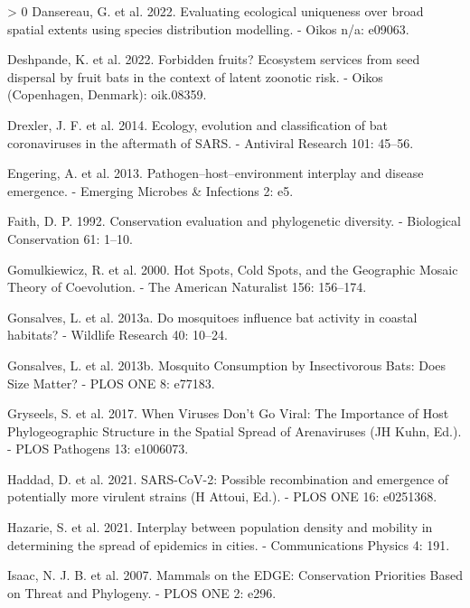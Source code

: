 \documentclass[11pt]{article}
\newlength{\cslhangindent}
\newenvironment{CSLReferences}[3] %
 {%
  \setlength{\parindent}{0pt}
  \ifodd #1 \everypar{\setlength{\hangindent}{\cslhangindent}}\ignorespaces\fi
  \ifnum #2 > 0
  \setlength{\parskip}{#2\baselineskip}
  \fi
 }%
 {}
\begin{document}
\begin{CSLReferences}{1}{0}
\leavevmode\hypertarget{ref-Dansereau2022EvaEco}{}%
Dansereau, G. et al. 2022. Evaluating ecological uniqueness over broad
spatial extents using species distribution modelling. - Oikos n/a:
e09063.

\leavevmode\hypertarget{ref-Deshpande2022ForFru}{}%
Deshpande, K. et al. 2022. Forbidden fruits? Ecosystem services from
seed dispersal by fruit bats in the context of latent zoonotic risk. -
Oikos (Copenhagen, Denmark): oik.08359.

\leavevmode\hypertarget{ref-Drexler2014EcoEvo}{}%
Drexler, J. F. et al. 2014. Ecology, evolution and classification of bat
coronaviruses in the aftermath of SARS. - Antiviral Research 101:
45--56.

\leavevmode\hypertarget{ref-Engering2013PatHos}{}%
Engering, A. et al. 2013. Pathogen--host--environment interplay and
disease emergence. - Emerging Microbes \& Infections 2: e5.

\leavevmode\hypertarget{ref-Faith1992ConEva}{}%
Faith, D. P. 1992. Conservation evaluation and phylogenetic diversity. -
Biological Conservation 61: 1--10.

\leavevmode\hypertarget{ref-Gomulkiewicz2000HotSpo}{}%
Gomulkiewicz, R. et al. 2000. Hot Spots, Cold Spots, and the Geographic
Mosaic Theory of Coevolution. - The American Naturalist 156: 156--174.

\leavevmode\hypertarget{ref-Gonsalves2013MosInf}{}%
Gonsalves, L. et al. 2013a. Do mosquitoes influence bat activity in
coastal habitats? - Wildlife Research 40: 10--24.

\leavevmode\hypertarget{ref-Gonsalves2013MosCon}{}%
Gonsalves, L. et al. 2013b. Mosquito Consumption by Insectivorous Bats:
Does Size Matter? - PLOS ONE 8: e77183.

\leavevmode\hypertarget{ref-Gryseels2017WheVir}{}%
Gryseels, S. et al. 2017. When Viruses Don't Go Viral: The Importance of
Host Phylogeographic Structure in the Spatial Spread of Arenaviruses (JH
Kuhn, Ed.). - PLOS Pathogens 13: e1006073.

\leavevmode\hypertarget{ref-Haddad2021SarPos}{}%
Haddad, D. et al. 2021. SARS-CoV-2: Possible recombination and emergence
of potentially more virulent strains (H Attoui, Ed.). - PLOS ONE 16:
e0251368.

\leavevmode\hypertarget{ref-Hazarie2021IntPop}{}%
Hazarie, S. et al. 2021. Interplay between population density and
mobility in determining the spread of epidemics in cities. -
Communications Physics 4: 191.

\leavevmode\hypertarget{ref-Isaac2007MamEdg}{}%
Isaac, N. J. B. et al. 2007. Mammals on the EDGE: Conservation
Priorities Based on Threat and Phylogeny. - PLOS ONE 2: e296.


\end{CSLReferences}
\end{document}
